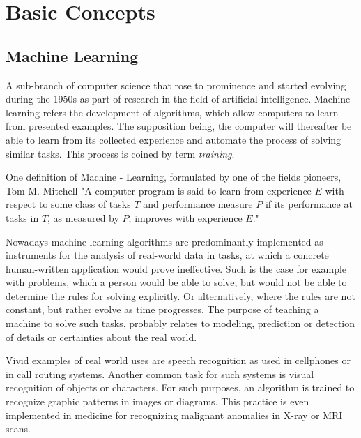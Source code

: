 \section{Basic Concepts}
	\subsection{Machine Learning}
		A sub-branch of computer science that rose to prominence and started evolving during the 1950s as part of research in the field of artificial intelligence. Machine learning refers the development of algorithms, which allow computers to learn from presented examples. The supposition being, the computer will thereafter be able to learn from its collected experience and automate the process of solving similar tasks. This process is coined by term \textit{training}.
		\par
		One definition of Machine - Learning, formulated by one of the fields pioneers, Tom M. Mitchell \cite{mitchell} "A computer program is said to learn from experience $E$ with respect to some class of tasks $ T $ and performance measure $ P $ if its performance at tasks in $ T $, as measured by $ P $, improves with experience $ E $."
		\par
		Nowadays machine learning algorithms are predominantly implemented as instruments for the analysis of real-world data in tasks, at which a concrete human-written application would prove ineffective. Such is the case for example with problems, which a person would be able to solve, but would not be able to determine the rules for solving explicitly. Or alternatively, where the rules are not constant, but rather evolve as time progresses. The purpose of teaching a machine to solve such tasks, probably relates to modeling, prediction or detection of details or certainties about the real world. 
		\par
		Vivid examples of real world uses are speech recognition as used in cellphones or in 
		call routing systems. Another common task for such systems is visual recognition of objects or characters. For such purposes, an algorithm is trained to recognize graphic patterns in images or diagrams. This practice is even implemented in medicine for recognizing malignant anomalies in X-ray or MRI scans. 
		
